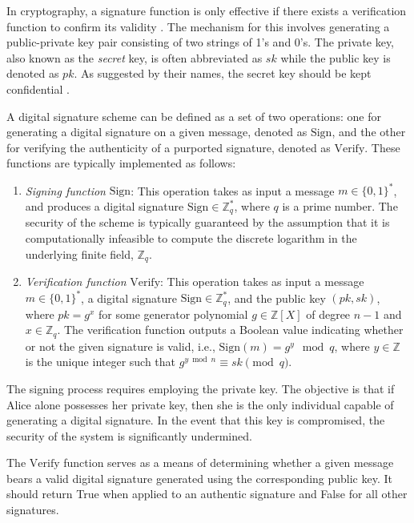 In cryptography, a signature function is only effective if there exists a verification function to confirm its validity \cite{stallings2006cryptography}. The mechanism for this involves generating a public-private key pair consisting of two strings of 1's and 0's. The private key, also known as the \textit{secret} key, is often abbreviated as $sk$ while the public key is denoted as $pk$. As suggested by their names, the secret key should be kept confidential \cite{dss}.

A digital signature scheme can be defined as a set of two operations: one for generating a digital signature on a given message, denoted as $\text{Sign}$, and the other for verifying the authenticity of a purported signature, denoted as $\text{Verify}$. These functions are typically implemented as follows:

\begin{enumerate}
    \item \emph{Signing function} $\text{Sign}$: This operation takes as input a message $m \in \{0, 1\}^*$, and produces a digital signature
    $\text{Sign} \in \mathbb{Z}_q^*$, where $q$ is a prime number. The security of the scheme is typically guaranteed by the assumption that it is computationally infeasible to compute the discrete logarithm in the underlying finite field, $\mathbb{Z}_q$.

    \item \emph{Verification function} $\text{Verify}$: This operation takes as input a message $m \in \{0, 1\}^*$, a digital signature $\text{Sign} \in \mathbb{Z}_q^*$, and the public key $(pk, sk)$, where $pk = g^x$ for some generator polynomial $g \in \mathbb{Z}[X]$ of degree $n-1$ and $x \in \mathbb{Z}_q$. The verification function outputs a Boolean value indicating whether or not the given signature is valid, i.e., $\text{Sign}(m) = g^y \mod q$, where $y \in \mathbb{Z}$ is the unique integer such that $g^{y\bmod{n}} \equiv sk \pmod{q}$.

\end{enumerate}

The signing process requires employing the private key. The objective is that if Alice alone possesses her private key, then she is the only individual capable of generating a digital signature. In the event that this key is compromised, the security of the system is significantly undermined.

The $\text{Verify}$ function serves as a means of determining whether a given message bears a valid digital signature generated using the corresponding public key. It should return True when applied to an authentic signature and False for all other signatures.

